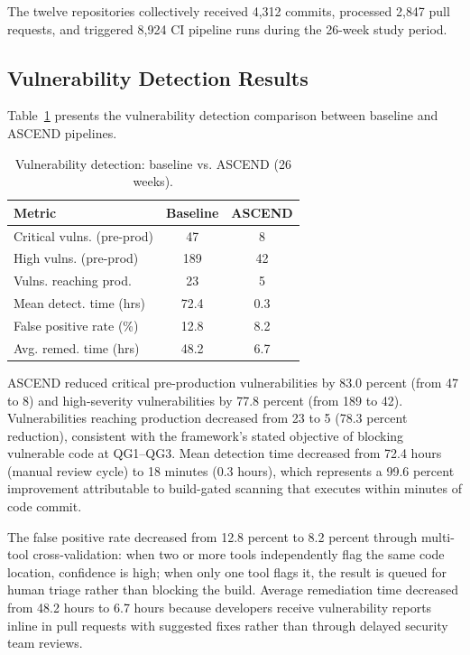 \documentclass{ieeeaccess}
\begin{document}
The twelve repositories collectively received 4{,}312 commits, processed 2{,}847 pull requests, and triggered 8{,}924 CI pipeline runs during the 26-week study period.

\subsection{Vulnerability Detection Results}
Table~\ref{tab:vuln} presents the vulnerability detection comparison between baseline and ASCEND pipelines.

\begin{table}[!t]
\caption{Vulnerability detection: baseline vs. ASCEND (26 weeks).}
\label{tab:vuln}
\centering
\begin{tabular}{lcc}
\hline
\textbf{Metric} & \textbf{Baseline} & \textbf{ASCEND} \\
\hline
Critical vulns. (pre-prod)     & 47    & 8    \\
High vulns. (pre-prod)         & 189   & 42   \\
Vulns. reaching prod.          & 23    & 5    \\
Mean detect. time (hrs)        & 72.4  & 0.3  \\
False positive rate (\%)       & 12.8  & 8.2  \\
Avg. remed. time (hrs)         & 48.2  & 6.7  \\
\hline
\end{tabular}
\end{table}

ASCEND reduced critical pre-production vulnerabilities by 83.0 percent (from 47 to 8) and high-severity vulnerabilities by 77.8 percent (from 189 to 42). Vulnerabilities reaching production decreased from 23 to 5 (78.3 percent reduction), consistent with the framework's stated objective of blocking vulnerable code at QG1--QG3. Mean detection time decreased from 72.4 hours (manual review cycle) to 18 minutes (0.3 hours), which represents a 99.6 percent improvement attributable to build-gated scanning that executes within minutes of code commit.

The false positive rate decreased from 12.8 percent to 8.2 percent through multi-tool cross-validation: when two or more tools independently flag the same code location, confidence is high; when only one tool flags it, the result is queued for human triage rather than blocking the build. Average remediation time decreased from 48.2 hours to 6.7 hours because developers receive vulnerability reports inline in pull requests with suggested fixes rather than through delayed security team reviews.
\end{document}
